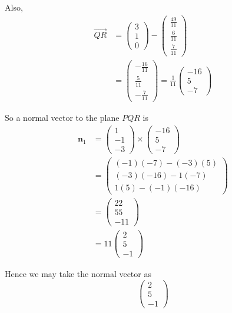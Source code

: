 \documentclass[leqno]{article}
\begin{document}
\begin{enumerate}[
  label=\textbf{\arabic*.},
  leftmargin=*,
  topsep=0pt,
  partopsep=0pt,
  parsep=0pt
]
\begin{tcolorbox}[colback=white, colframe=scarlet, title={\textbf{Solution}}, breakable, grow to left by=6mm, grow to right by=10mm]
\begin{enumerate}[label=\textbf{(\alph*)}]
Also,
\begin{align*}
\overrightarrow{QR}
&=
\begin{pmatrix}3\\1\\0\end{pmatrix}
-
\begin{pmatrix}\frac{49}{11}\\[2pt]\frac{6}{11}\\[2pt]\frac{7}{11}\end{pmatrix}\\
&=
\begin{pmatrix}
-\frac{16}{11}\\[2pt]
\frac{5}{11}\\[2pt]
-\frac{7}{11}
\end{pmatrix}
=
\frac{1}{11}
\begin{pmatrix}
-16\\5\\-7
\end{pmatrix}
\end{align*}

So a normal vector to the plane \(PQR\) is
\begin{align*}
\mathbf n_1
&=
\begin{pmatrix}1\\-1\\-3\end{pmatrix}
\times
\begin{pmatrix}-16\\5\\-7\end{pmatrix}\\
&=
\begin{pmatrix}
(-1)(-7)-(-3)(5)\\
(-3)(-16)-1(-7)\\
1(5)-(-1)(-16)
\end{pmatrix}\\
&=
\begin{pmatrix}
22\\55\\-11
\end{pmatrix}\\
&=
11\begin{pmatrix}2\\5\\-1\end{pmatrix}
\end{align*}

Hence we may take the normal vector as
\[
\begin{pmatrix}2\\5\\-1\end{pmatrix}
\]


\end{enumerate}
\end{tcolorbox}
\end{enumerate}
\end{document}
